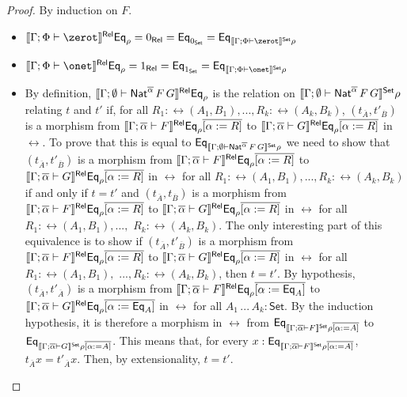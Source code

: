 \documentclass[runningheads]{llncs}
\newcommand{\set}{\mathsf{Set}}
\begin{document}
\begin{proof}
By induction on $F$.
\begin{itemize}
\item $\relsem{\Gamma; \Phi \vdash \zerot} \Eq_{\rho} = 0_\rel =
  \Eq_{0_\set} = \Eq_{\setsem{\Gamma; \Phi \vdash \zerot}\rho}$
\item $\relsem{\Gamma; \Phi \vdash \onet} \Eq_{\rho} = 1_\rel =
  \Eq_{1_\set} = \Eq_{\setsem{\Gamma; \Phi \vdash \onet}\rho}$

\item
By definition, $\llbracket{\Gamma; \emptyset \vdash
  \mathsf{Nat}^{\overline\alpha} \,F\,G}\rrbracket^{\mathsf{Rel}} \mathsf{Eq}_{\rho}$ is the relation on
  $\setsem{\Gamma; \emptyset \vdash \Nat^{\overline\alpha} \,F\,G}
  \rho$ relating $t$ and $t'$ if, for all ${R_1 :
    \rel(A_1,B_1)},...,{R_k : \rel(A_k,B_k)}$, $(t_{\overline{A}},
  t'_{\overline{B}})$ is a morphism from $\llbracket{\Gamma;
    \overline\alpha \vdash F}\rrbracket^{\mathsf{Rel}} \mathsf{Eq}_{\rho}\overline{[\alpha := R]}$ to
  $\llbracket{\Gamma ; \overline\alpha \vdash G}\rrbracket^{\mathsf{Rel}}
  \mathsf{Eq}_{\rho}\overline{[\alpha := R]}$ in $\rel$.  To prove that this
  is equal to $\Eq_{\setsem{\Gamma; \emptyset \vdash
      \Nat^{\overline\alpha} \,F\,G} \rho}$ we need to show that
  $(t_{\overline{A}}, t'_{\overline{B}})$ is a morphism from
  $\llbracket{\Gamma; \overline\alpha \vdash F}\rrbracket^{\mathsf{Rel}}
  \mathsf{Eq}_{\rho}\overline{[\alpha := R]}$ to $\llbracket{\Gamma ;
  \overline\alpha \vdash G}\rrbracket^{\mathsf{Rel}} \mathsf{Eq}_{\rho}\overline{[\alpha := R]}$ in
  $\rel$ for all ${R_1 : \rel(A_1,B_1)},...,{R_k : \rel(A_k,B_k)}$ if
  and only if $t = t'$ and $(t_{\overline{A}}, t_{\overline{B}})$ is a
  morphism from $\llbracket{\Gamma; \overline\alpha \vdash F}\rrbracket^{\mathsf{Rel}}
  \mathsf{Eq}_{\rho}\overline{[\alpha := R]}$ to $\llbracket{\Gamma ; \overline
    \alpha \vdash G}\rrbracket^{\mathsf{Rel}} \mathsf{Eq}_{\rho}\overline{[\alpha := R]}$ in $\rel$ for
  all ${R_1 : \rel(A_1,B_1)}, ...,$ ${R_k : \rel(A_k,B_k)}$. The only
  interesting part of this equivalence is to show if
  $(t_{\overline{A}}, t'_{\overline{B}})$ is a morphism from
  $\llbracket{\Gamma; \overline\alpha \vdash F}\rrbracket^{\mathsf{Rel}}
  \mathsf{Eq}_{\rho}\overline{[\alpha := R]}$ to $\llbracket{\Gamma ;
    \overline\alpha \vdash G}\rrbracket^{\mathsf{Rel}} \mathsf{Eq}_{\rho}\overline{[\alpha := R]}$ in
  $\rel$ for all ${R_1 : \rel(A_1,B_1),}$ $...,{R_k : \rel(A_k,B_k)}$,
  then $t = t'$.  By hypothesis, $(t_{\overline{A}},
  t'_{\overline{A}})$ is a morphism from $\llbracket{\Gamma;
    \overline\alpha \vdash F}\rrbracket^{\mathsf{Rel}} \mathsf{Eq}_{\rho}\overline{[\alpha :=
      \mathsf{Eq}_{A}]}$ to $\llbracket{\Gamma ; \overline\alpha \vdash G}\rrbracket^{\mathsf{Rel}}
  \mathsf{Eq}_{\rho}\overline{[\alpha := \mathsf{Eq}_{A}]}$ in $\rel$ for all
  $A_1\,...\,A_k : \set$. By the induction hypothesis, it is therefore
  a morphism in $\rel$ from $\Eq_{\setsem{\Gamma; \overline\alpha \vdash F}
    \rho\overline{[\alpha := A]}}$ to $\Eq_{\setsem{\Gamma;
      \overline\alpha \vdash G} \rho\overline{[\alpha := A]}}$.
   This means that, for every $x : \Eq_{\setsem{\Gamma;
      \overline\alpha \vdash F} \rho\overline{[\alpha := A]}}$,
  $t_{\overline{A}}x = t'_{\overline{A}}x$.  Then, by extensionality,
  $t = t'$.


\end{itemize}
\end{proof}
\end{document}
